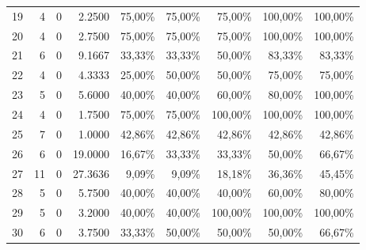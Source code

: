 \begin{table}[htbp]
{\begin{tabular}{r r r r r r r r r}
    19 & 4 & 0 & 2.2500 & 75,00\% & 75,00\% & 75,00\% & 100,00\% & 100,00\% \\
    20 & 4 & 0 & 2.7500 & 75,00\% & 75,00\% & 75,00\% & 100,00\% & 100,00\% \\
    21 & 6 & 0 & 9.1667 & 33,33\% & 33,33\% & 50,00\% & 83,33\% & 83,33\% \\
    22 & 4 & 0 & 4.3333 & 25,00\% & 50,00\% & 50,00\% & 75,00\% & 75,00\% \\
    23 & 5 & 0 & 5.6000 & 40,00\% & 40,00\% & 60,00\% & 80,00\% & 100,00\% \\
    24 & 4 & 0 & 1.7500 & 75,00\% & 75,00\% & 100,00\% & 100,00\% & 100,00\% \\
    25 & 7 & 0 & 1.0000 & 42,86\% & 42,86\% & 42,86\% & 42,86\% & 42,86\% \\
    26 & 6 & 0 & 19.0000 & 16,67\% & 33,33\% & 33,33\% & 50,00\% & 66,67\% \\
    27 & 11 & 0 & 27.3636 & 9,09\% & 9,09\% & 18,18\% & 36,36\% & 45,45\% \\
    28 & 5 & 0 & 5.7500 & 40,00\% & 40,00\% & 40,00\% & 60,00\% & 80,00\% \\
    29 & 5 & 0 & 3.2000 & 40,00\% & 40,00\% & 100,00\% & 100,00\% & 100,00\% \\
    30 & 6 & 0 & 3.7500 & 33,33\% & 50,00\% & 50,00\% & 50,00\% & 66,67\% \\
    \bottomrule
    \end{tabular}
    }
    \end{table}
    
    
    
